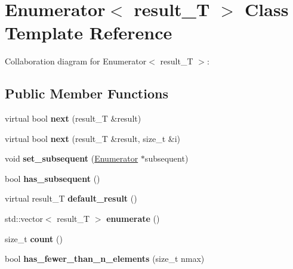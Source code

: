 \hypertarget{classEnumerator}{}\section{Enumerator$<$ result\+\_\+T $>$ Class Template Reference}
\label{classEnumerator}


Collaboration diagram for Enumerator$<$ result\+\_\+T $>$\+:
\subsection*{Public Member Functions}
\begin{DoxyCompactItemize}
\item 
virtual bool {\bfseries next} (result\+\_\+T \&result)\hypertarget{classEnumerator_a8ef6adfaa42901cb007eceef976b2634}{}\label{classEnumerator_a8ef6adfaa42901cb007eceef976b2634}

\item 
virtual bool {\bfseries next} (result\+\_\+T \&result, size\+\_\+t \&i)\hypertarget{classEnumerator_a7f820d7df4327fee1fd3a04ccae5d0bc}{}\label{classEnumerator_a7f820d7df4327fee1fd3a04ccae5d0bc}

\item 
void {\bfseries set\+\_\+subsequent} (\hyperlink{classEnumerator}{Enumerator} $\ast$subsequent)\hypertarget{classEnumerator_ae19248dcf830648c75afcdcc6c2416a5}{}\label{classEnumerator_ae19248dcf830648c75afcdcc6c2416a5}

\item 
bool {\bfseries has\+\_\+subsequent} ()\hypertarget{classEnumerator_a5b31a40fed7827f62084b8f56b48e243}{}\label{classEnumerator_a5b31a40fed7827f62084b8f56b48e243}

\item 
virtual result\+\_\+T {\bfseries default\+\_\+result} ()\hypertarget{classEnumerator_a25a7f1ec275d165f5e37e555861450c5}{}\label{classEnumerator_a25a7f1ec275d165f5e37e555861450c5}

\item 
std\+::vector$<$ result\+\_\+T $>$ {\bfseries enumerate} ()\hypertarget{classEnumerator_a7214314662f3c7ec12f72552a9426ed0}{}\label{classEnumerator_a7214314662f3c7ec12f72552a9426ed0}

\item 
size\+\_\+t {\bfseries count} ()\hypertarget{classEnumerator_a19a17aeb516edf558c9188625c52984a}{}\label{classEnumerator_a19a17aeb516edf558c9188625c52984a}

\item 
bool {\bfseries has\+\_\+fewer\+\_\+than\+\_\+n\+\_\+elements} (size\+\_\+t nmax)\hypertarget{classEnumerator_a1268f2dba0f3d90d1b73f137c488edb8}{}\label{classEnumerator_a1268f2dba0f3d90d1b73f137c488edb8}

\end{DoxyCompactItemize}
